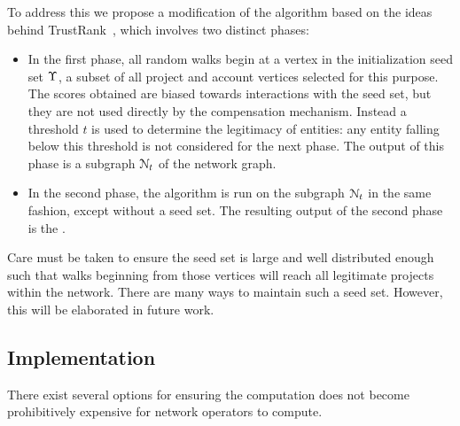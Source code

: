 To address this we propose a modification of the \pagerank{} algorithm based
on the ideas behind TrustRank~\cite{trustrank}, which involves two distinct
phases:

\begin{itemize}
\item In the first phase, all random walks begin at a vertex in the
  initialization seed set $\Upsilon$, a subset of all project and account
  vertices selected for this purpose.
  The scores obtained are biased towards interactions with the seed set, but
  they are not used directly by the compensation mechanism. Instead a threshold
  $t$ is used to determine the legitimacy of entities: any entity falling below
  this threshold is not considered for the next phase. The output of this phase
  is a subgraph $\mathcal{N}_t$ of the network graph.
\item In the second phase, the algorithm is run on the subgraph $\mathcal{N}_t$
  in the same fashion, except without a seed set. The resulting output of the
  second phase is the \osrank{}.
\end{itemize}
Care must be taken to ensure the seed set is large and well distributed enough
such that walks beginning from those vertices will reach all legitimate
projects within the network. There are many ways to maintain such a seed set.
However, this will be elaborated in future work.

\subsection{Implementation}

There exist several options for ensuring the \osrank{} computation
does not become prohibitively expensive for network operators to compute.

